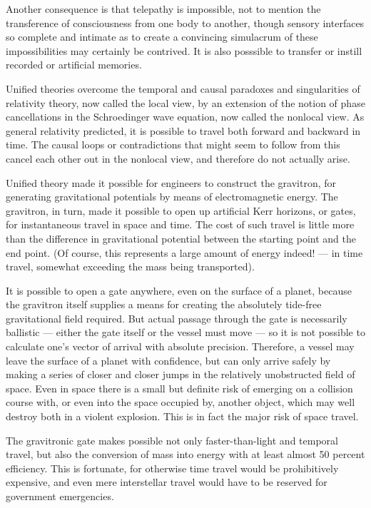 \documentclass[english,11pt,letterpaper,onecolumn]{scrbook}
\begin{document}
	Another consequence is that telepathy is impossible, not to mention the transference of consciousness from one body to another, though sensory interfaces so complete and intimate as to create a convincing simulacrum of these impossibilities may certainly be contrived.  It is also posssible to transfer or instill recorded or artificial memories.

	Unified theories overcome the temporal and causal paradoxes and singularities of relativity theory, now called the local view, by an extension of the notion of phase cancellations in the Schroedinger wave equation, now called the nonlocal view.  As general relativity predicted, it is possible to travel both forward and backward in time.  The causal loops or contradictions that might seem to follow from this cancel each other out in the nonlocal view, and therefore do not actually arise.

	Unified theory made it possible for engineers to construct the gravitron, for generating gravitational potentials by means of electromagnetic energy.  The gravitron, in turn, made it possible to open up artificial Kerr horizons, or gates, for instantaneous travel in space and time.  The cost of such travel is little more than the difference in gravitational potential between the starting point and the end point.  (Of course, this represents a large amount of energy indeed! --- in time travel, somewhat exceeding the mass being transported).

	It is possible to open a gate anywhere, even on the surface of a planet, because the gravitron itself supplies a means for creating the absolutely tide-free gravitational field required.  But actual passage through the gate is necessarily ballistic --- either the gate itself or the vessel must move --- so it is not possible to calculate one's vector of arrival with absolute precision.  Therefore, a vessel may leave the surface of a planet with confidence, but can only arrive safely by making a series of closer and closer jumps in the relatively unobstructed field of space.  Even in space there is a small but definite risk of emerging on a collision course with, or even into the space occupied by, another object, which may well destroy both in a violent explosion.  This is in fact the major risk of space travel.

	The gravitronic gate makes possible not only faster-than-light and temporal travel, but also the conversion of mass into energy with at least almost 50 percent efficiency.  This is fortunate, for otherwise time travel would be prohibitively expensive, and even mere interstellar travel would have to be reserved for government emergencies.
\end{document}
